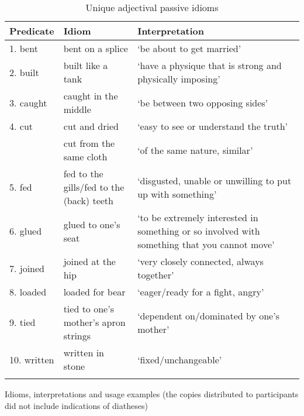 \documentclass[output=paper]{langsci/langscibook}
\begin{document}
\begin{table}[H]
\small
\caption{Unique adjectival passive idioms}
\begin{tabularx}{\textwidth}{llQ}
\lsptoprule
{Predicate} & {Idiom} & {Interpretation}\\
\midrule
{1. bent}     & {bent on a splice}                             & ‘be about to get married’\\
{2. built}    & {built like a tank}                            & ‘have a physique that is strong and physically imposing’\\
{3. caught}   & {caught in the middle}                         & ‘be between two opposing sides’ \\
{4. cut}      & {cut and dried}                                & ‘easy to see or understand the truth’ \\
              & {cut from the same cloth}                      & ‘of the same nature, similar’ \\
{5. fed}      & {fed to the gills\slash fed to the (back) teeth } & ‘disgusted, unable or unwilling to put up with something’ \\
{6. glued}    & {glued to one’s seat}                          & ‘to be extremely interested in something or so involved with something that you cannot move’\\
{7. joined}   & {joined at the hip}                            & ‘very closely connected, always together’\\
{8. loaded}   & { loaded for bear}                             & ‘eager/ready for a fight, angry’\\
{9. tied}     & { tied to one’s mother’s apron strings}        & ‘dependent on/dominated by one’s mother’ \\
{10. written} & { written in stone}                            & ‘fixed/unchangeable’ \\
\lspbottomrule
\end{tabularx}
\end{table}

\clearpage
{}\label{app-14:b}


Idioms, interpretations and usage examples (the copies distributed
to participants did not include indications of diatheses)
\end{document}
